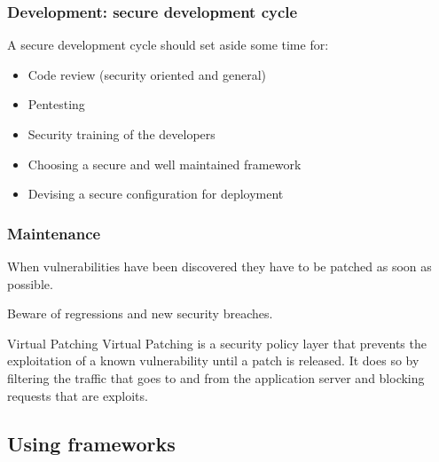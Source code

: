 \begin{frame}
\frametitle{Development: secure development cycle}
A secure development cycle should set aside some time for:
\begin{itemize}
\item Code review \small{(security oriented and general)}
\item Pentesting
\item Security training of the developers
\item Choosing a secure and well maintained framework
\item Devising a secure configuration for deployment
\end{itemize}

\end{frame}

\begin{frame}
\frametitle{Maintenance}
When vulnerabilities have been discovered they have to be patched as soon as
possible.

Beware of regressions and new security breaches.

\begin{block}{Virtual Patching}
Virtual Patching is a security policy layer that prevents the exploitation of a known
vulnerability until a patch is released. It does so by filtering the
traffic that goes to and from the application server and blocking
requests that are exploits.
\end{block}

\end{frame}

\subsection{Using frameworks}

